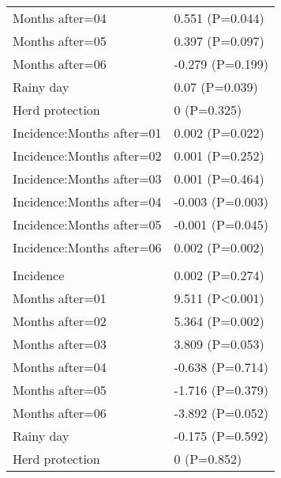 \documentclass[]{article}
\begin{document}
\begin{longtable}[t]{ll}
\hspace{1em}Months after=04 & 0.551 (P=0.044)\\
\hspace{1em}Months after=05 & 0.397 (P=0.097)\\
\hspace{1em}Months after=06 & -0.279 (P=0.199)\\
\hspace{1em}Rainy day & 0.07 (P=0.039)\\
\hspace{1em}Herd protection & 0 (P=0.325)\\
\hspace{1em}Incidence:Months after=01 & 0.002 (P=0.022)\\
\hspace{1em}Incidence:Months after=02 & 0.001 (P=0.252)\\
\hspace{1em}Incidence:Months after=03 & 0.001 (P=0.464)\\
\hspace{1em}Incidence:Months after=04 & -0.003 (P=0.003)\\
\hspace{1em}Incidence:Months after=05 & -0.001 (P=0.045)\\
\hspace{1em}Incidence:Months after=06 & 0.002 (P=0.002)\\
\addlinespace[1.5em]
\multicolumn{2}{l}{\textbf{Temporary not field worker}}\\
\hspace{1em}Incidence & 0.002 (P=0.274)\\
\hspace{1em}Months after=01 & 9.511 (P<0.001)\\
\hspace{1em}Months after=02 & 5.364 (P=0.002)\\
\hspace{1em}Months after=03 & 3.809 (P=0.053)\\
\hspace{1em}Months after=04 & -0.638 (P=0.714)\\
\hspace{1em}Months after=05 & -1.716 (P=0.379)\\
\hspace{1em}Months after=06 & -3.892 (P=0.052)\\
\hspace{1em}Rainy day & -0.175 (P=0.592)\\
\hspace{1em}Herd protection & 0 (P=0.852)\\

\end{longtable}
\end{document}

